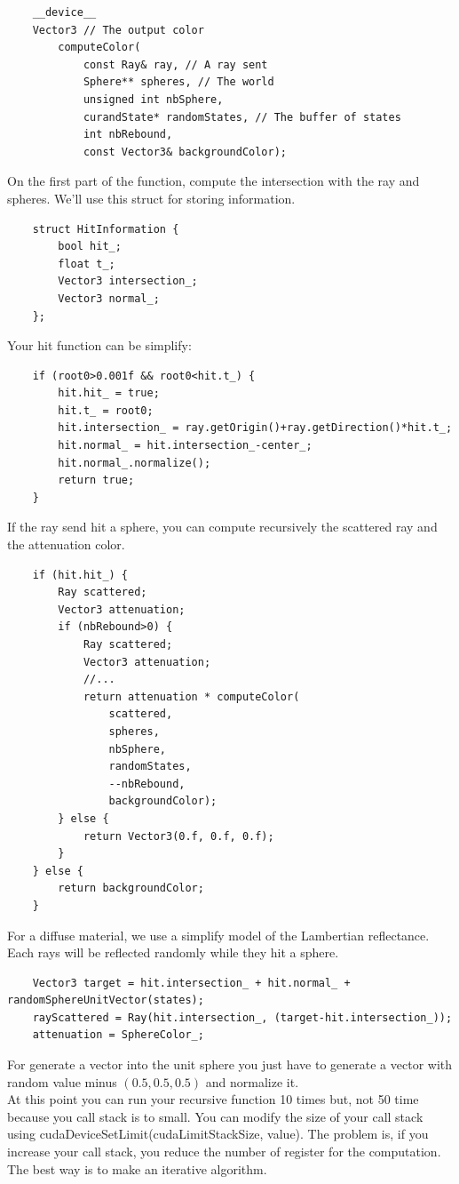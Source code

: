 \documentclass{article}
\begin{document}
\begin{lstlisting}
	__device__
	Vector3 // The output color
		computeColor(
			const Ray& ray, // A ray sent
			Sphere** spheres, // The world
			unsigned int nbSphere,
			curandState* randomStates, // The buffer of states
			int nbRebound,
			const Vector3& backgroundColor);
\end{lstlisting}
On the first part of the function, compute the intersection with the ray and spheres. We'll use this struct for storing information.
\begin{lstlisting}
	struct HitInformation {
		bool hit_;
		float t_;
		Vector3 intersection_;
		Vector3 normal_;
	};
\end{lstlisting}
Your hit function can be simplify:
\begin{lstlisting}
	if (root0>0.001f && root0<hit.t_) {
		hit.hit_ = true;
		hit.t_ = root0;
		hit.intersection_ = ray.getOrigin()+ray.getDirection()*hit.t_;
		hit.normal_ = hit.intersection_-center_;
		hit.normal_.normalize();
		return true;
	}
\end{lstlisting}
If the ray send hit a sphere, you can compute recursively the scattered ray and the attenuation color. 
\begin{lstlisting}
	if (hit.hit_) {
		Ray scattered;
		Vector3 attenuation;
		if (nbRebound>0) {
			Ray scattered;
			Vector3 attenuation;
			//...
			return attenuation * computeColor(
				scattered,
				spheres,
				nbSphere,
				randomStates,
				--nbRebound,
				backgroundColor);
		} else {
			return Vector3(0.f, 0.f, 0.f);
		}
	} else {
		return backgroundColor;
	}
\end{lstlisting}
For a diffuse material, we use a simplify model of the Lambertian reflectance. Each rays will be reflected randomly while they hit a sphere.

\begin{lstlisting}
	Vector3 target = hit.intersection_ + hit.normal_ + randomSphereUnitVector(states);
	rayScattered = Ray(hit.intersection_, (target-hit.intersection_));
	attenuation = SphereColor_;
\end{lstlisting}

For generate a vector into the unit sphere you just have to generate a vector with random value minus $(0.5, 0.5, 0.5)$ and normalize it.\\
At this point you can run your recursive function 10 times but, not 50 time because you call stack is to small. You can modify the size of your call stack using cudaDeviceSetLimit(cudaLimitStackSize, value). The problem is, if you increase your call stack, you reduce the number of register for the computation. The best way is to make an iterative algorithm.
\end{document}
